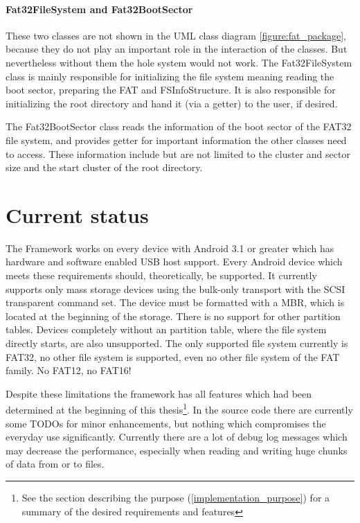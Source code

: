 \subsubsection{Fat32FileSystem and Fat32BootSector}

These two classes are not shown in the UML class diagram \ref{figure:fat_package}, because they do not play an important role in the interaction of the classes. But nevertheless without them the hole system would not work. The Fat32FileSystem class is mainly responsible for initializing the file system meaning reading the boot sector, preparing the FAT and FSInfoStructure. It is also responsible for initializing the root directory and hand it (via a getter) to the user, if desired.

The Fat32BootSector class reads the information of the boot sector of the FAT32 file system, and provides getter for important information the other classes need to access. These information include but are not limited to the cluster and sector size and the start cluster of the root directory.

\chapter{Current status}

The Framework works on every device with Android 3.1 or greater which has hardware and software enabled USB host support. Every Android device which meets these requirements should, theoretically, be supported. It currently supports only mass storage devices using the bulk-only transport with the SCSI transparent command set. The device must be formatted with a MBR, which is located at the beginning of the storage. There is no support for other partition tables. Devices completely without an partition table, where the file system directly starts, are also unsupported. The only supported file system currently is FAT32, no other file system is supported, even no other file system of the FAT family. No FAT12, no FAT16!

Despite these limitations the framework has all features which had been determined at the beginning of this thesis\footnote{See the section describing the purpose (\ref{implementation_purpose}) for a summary of the desired requirements and features}. In the source code there are currently some TODOs for minor enhancements, but nothing which compromises the everyday use significantly. Currently there are a lot of debug log messages which may decrease the performance, especially when reading and writing huge chunks of data from or to files.